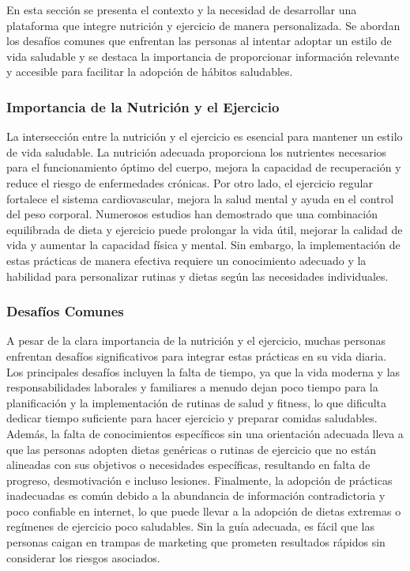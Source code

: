 En esta sección se presenta el contexto y la necesidad de desarrollar una plataforma que integre nutrición y ejercicio de manera personalizada. Se abordan los desafíos comunes que enfrentan las personas al intentar adoptar un estilo de vida saludable y se destaca la importancia de proporcionar información relevante y accesible para facilitar la adopción de hábitos saludables.

\subsubsection{Importancia de la Nutrición y el Ejercicio}
La intersección entre la nutrición y el ejercicio es esencial para mantener un estilo de vida saludable. La nutrición adecuada proporciona los nutrientes necesarios para el funcionamiento óptimo del cuerpo, mejora la capacidad de recuperación y reduce el riesgo de enfermedades crónicas. Por otro lado, el ejercicio regular fortalece el sistema cardiovascular, mejora la salud mental y ayuda en el control del peso corporal.
Numerosos estudios han demostrado que una combinación equilibrada de dieta y ejercicio puede prolongar la vida útil, mejorar la calidad de vida y aumentar la capacidad física y mental. Sin embargo, la implementación de estas prácticas de manera efectiva requiere un conocimiento adecuado y la habilidad para personalizar rutinas y dietas según las necesidades individuales.
\subsubsection{Desafíos Comunes}
A pesar de la clara importancia de la nutrición y el ejercicio, muchas personas enfrentan desafíos significativos para integrar estas prácticas en su vida diaria. Los principales desafíos incluyen la falta de tiempo, ya que la vida moderna y las responsabilidades laborales y familiares a menudo dejan poco tiempo para la planificación y la implementación de rutinas de salud y fitness, lo que dificulta dedicar tiempo suficiente para hacer ejercicio y preparar comidas saludables. Además, la falta de conocimientos específicos sin una orientación adecuada lleva a que las personas adopten dietas genéricas o rutinas de ejercicio que no están alineadas con sus objetivos o necesidades específicas, resultando en falta de progreso, desmotivación e incluso lesiones. Finalmente, la adopción de prácticas inadecuadas es común debido a la abundancia de información contradictoria y poco confiable en internet, lo que puede llevar a la adopción de dietas extremas o regímenes de ejercicio poco saludables. Sin la guía adecuada, es fácil que las personas caigan en trampas de marketing que prometen resultados rápidos sin considerar los riesgos asociados.
